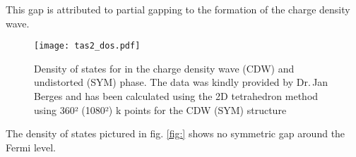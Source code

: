 \documentclass[main.tex]{subfiles}
\begin{document}
This gap is attributed to partial gapping to the formation of the charge density wave.

\begin{figure}[htb!]
    \centering
    \texttt{[image: tas2\_dos.pdf]}
    \caption{Density of states for \TaS in the charge density wave (CDW) and undistorted (SYM) phase. The data was kindly provided by Dr.\,Jan Berges and has been calculated using the 2D tetrahedron method using 360² (1080²) k points for the CDW (SYM) structure}
    \label{fig:tas2_dos}
\end{figure}
The density of states pictured in fig. \ref{fig:} shows no symmetric gap around the Fermi level.
\end{document}
